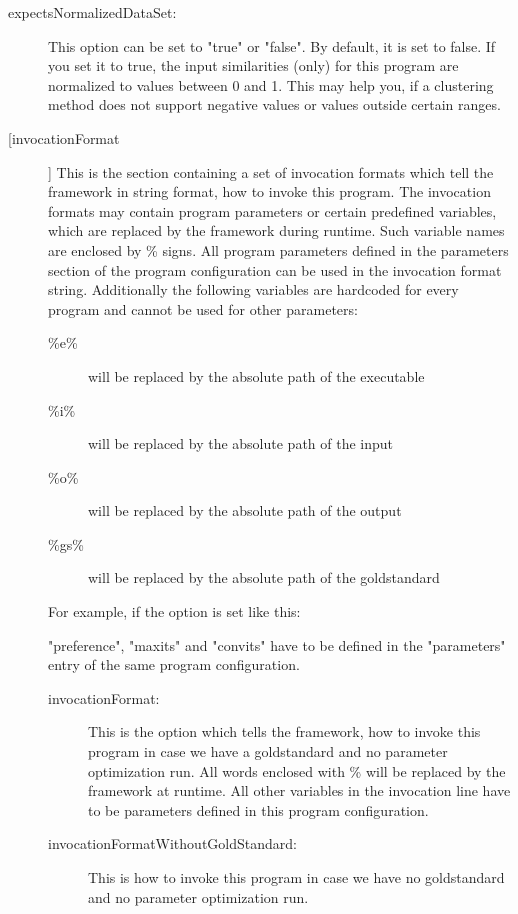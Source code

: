 \begin{description}
		\item[expectsNormalizedDataSet:] This option can be set to "true" or "false". By default, it is set to false. If you set it to true, the input similarities (only) for this program are normalized to values between 0 and 1. This may help you, if a clustering method does not support negative values or values outside certain ranges.
		
		\item[[invocationFormat]] This is the section containing a set of invocation formats which tell the framework in string format, how to invoke this program. The invocation formats may contain program parameters or certain predefined variables, which are replaced by the framework during runtime. Such variable names are enclosed by \% signs. All program parameters defined in the parameters section of the program configuration can be used in the invocation format string. Additionally the following variables are hardcoded for every program and cannot be used for other parameters:
			\begin{description}
				\item[\%e\%] will be replaced by the absolute path of the executable
				\item[\%i\%] will be replaced by the absolute path of the input
				\item[\%o\%] will be replaced by the absolute path of the output
				\item[\%gs\%] will be replaced by the absolute path of the goldstandard
			\end{description}
			
			For example, if the option is set like this:
			
				
			"preference", "maxits" and "convits" have to be defined in the "parameters" entry of the same program configuration.
			
	\begin{description}
		\item[invocationFormat:]
			This is the option which tells the framework, how to invoke this program in case we have a goldstandard and no parameter optimization run. All words enclosed with \% will be replaced by the framework at runtime. All other variables in the invocation line have to be parameters defined in this program configuration.
			
		\item[invocationFormatWithoutGoldStandard:]
			This is how to invoke this program in case we have no goldstandard and no parameter optimization run.
			

\end{description}
\end{description}
